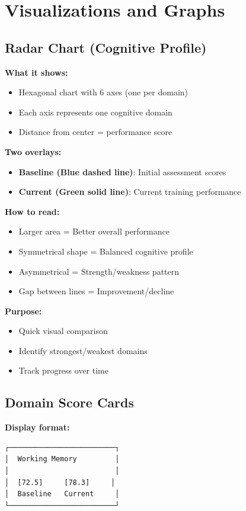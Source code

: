 \documentclass[12pt,a4paper]{article}
\begin{document}
\section{Visualizations and Graphs}

\subsection{Radar Chart (Cognitive Profile)}

\textbf{What it shows:}
\begin{itemize}
    \item Hexagonal chart with 6 axes (one per domain)
    \item Each axis represents one cognitive domain
    \item Distance from center = performance score
\end{itemize}

\textbf{Two overlays:}
\begin{itemize}
    \item \textbf{Baseline (Blue dashed line)}: Initial assessment scores
    \item \textbf{Current (Green solid line)}: Current training performance
\end{itemize}

\textbf{How to read:}
\begin{itemize}
    \item Larger area = Better overall performance
    \item Symmetrical shape = Balanced cognitive profile
    \item Asymmetrical = Strength/weakness pattern
    \item Gap between lines = Improvement/decline
\end{itemize}

\textbf{Purpose:}
\begin{itemize}
    \item Quick visual comparison
    \item Identify strongest/weakest domains
    \item Track progress over time
\end{itemize}

\subsection{Domain Score Cards}

\textbf{Display format:}
\begin{verbatim}
┌─────────────────────────┐
│  Working Memory         │
│                         │
│  [72.5]     [78.3]     │
│  Baseline   Current     │
└─────────────────────────┘
\end{verbatim}
\end{document}
